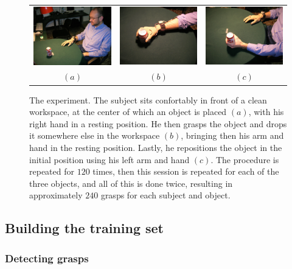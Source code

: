 \begin{figure}[htbp]
  \begin{center}
    \begin{tabular}{ccc}
      \includegraphics[width=0.3\linewidth]{exp1.eps} &
      \includegraphics[width=0.3\linewidth]{exp2.eps}  &
      \includegraphics[width=0.3\linewidth]{exp3.eps} \\
      $(a)$ & $(b)$ & $(c)$
    \end{tabular}
    \caption{The experiment. The subject sits confortably in front of
    a clean workspace, at the center of which an object is placed
    $(a)$, with his right hand in a resting position. He then grasps
    the object and drops it somewhere else in the workspace $(b)$,
    bringing then his arm and hand in the resting position. Lastly, he
    repositions the object in the initial position using his left arm
    and hand $(c)$. The procedure is repeated for $120$ times, then
    this session is repeated for each of the three objects, and all of
    this is done twice, resulting in approximately $240$ grasps for
    each subject and object.}
    \label{fig:setup}
  \end{center}
\end{figure}

\subsection{Building the training set}

\subsubsection*{Detecting grasps}

